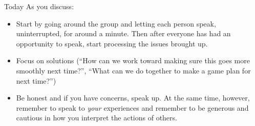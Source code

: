 \documentclass[11pt]{beamer}
\begin{document}
\begin{frame}[c]{Today}
As you discuss:
\begin{itemize}
    \item Start by going around the group and letting each person speak, uninterrupted, for around a minute. Then after everyone has had an opportunity to speak, start processing the issues brought up.
    \item Focus on solutions (``How can we work toward making sure this goes more smoothly next time?'', ``What can we do together to make a game plan for next time?'')
    \item Be honest and if you have concerns, speak up. At the same time, however, remember to speak to \emph{your} experiences and remember to be \alert{generous and cautious} in how you interpret the actions of others.
\end{itemize}
\end{frame}
\end{document}

